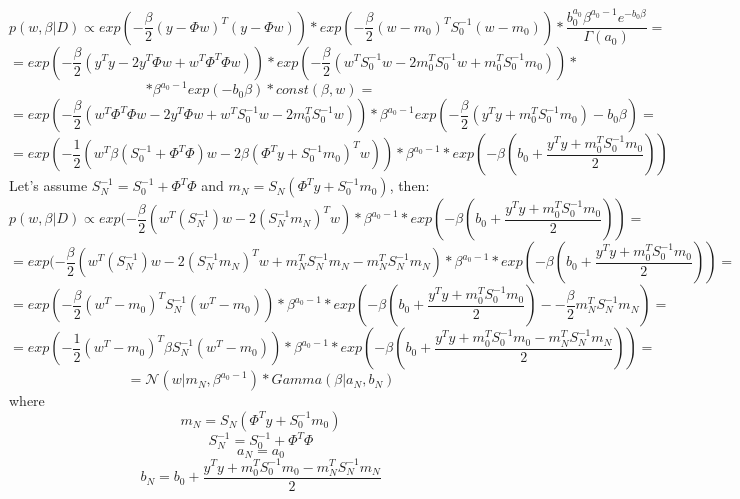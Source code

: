 \documentclass[11pt]{article}
\newcommand{\exercise}{\section{}}
\begin{document}
\exercise
$$p(w,\beta|D) \propto exp(-\frac{\beta}{2}(y-\Phi w)^T(y-\Phi w)) * exp(-\frac{\beta}{2}(w-m_0)^TS_0^{-1}(w-m_0))*\frac{b_0^{a_0}\beta^{a_0-1}e^{-b_0\beta}}{\Gamma(a_0)}=$$
$$= exp(-\frac{\beta}{2}(y^Ty-2y^T\Phi w+w^T\Phi^T\Phi w))*exp(-\frac{\beta}{2}(w^TS_0^{-1}w-2m_0^TS_0^{-1}w+m_0^TS_0^{-1}m_0))*$$
$$*\beta^{a_0-1}exp(-b_0\beta)*const(\beta,w)=$$
$$=exp(-\frac{\beta}{2}(w^T\Phi^T\Phi w-2y^T\Phi w+w^TS_0^{-1}w-2m_0^TS_0^{-1}w))*\beta^{a_0-1}exp(-\frac{\beta}{2}(y^Ty+m_0^TS_0^{-1}m_0)-b_0\beta)=$$
$$=exp(-\frac{1}{2}(w^T\beta(S_0^{-1}+\Phi^T\Phi)w-2\beta(\Phi^Ty+S_0^{-1}m_0)^Tw))*\beta^{a_0-1}*exp(-\beta(b_0+\frac{y^Ty+m_0^TS_0^{-1}m_0}{2}))$$
Let's assume $S_N^{-1}= S_0^{-1}+\Phi^T\Phi$ and $m_N= S_N(\Phi^Ty+S_0^{-1}m_0)$, then:
$$p(w,\beta|D) \propto exp(-\frac{\beta}{2}(w^T(S_N^{-1})w-2(S_N^{-1}m_N)^Tw)*\beta^{a_0-1}*exp(-\beta(b_0+\frac{y^Ty+m_0^TS_0^{-1}m_0}{2}))=$$
$$=exp(-\frac{\beta}{2}(w^T(S_N^{-1})w-2(S_N^{-1}m_N)^Tw+m_N^TS_N^{-1}m_N-m_N^TS_N^{-1}m_N)*\beta^{a_0-1}*exp(-\beta(b_0+\frac{y^Ty+m_0^TS_0^{-1}m_0}{2}))= $$
$$=exp(-\frac{\beta}{2}(w^T-m_0)^TS_N^{-1}(w^T-m_0))*\beta^{a_0-1}*exp(-\beta(b_0+\frac{y^Ty+m_0^TS_0^{-1}m_0}{2})--\frac{\beta}{2}m_N^TS_N^{-1}m_N)=$$
$$=exp(-\frac{1}{2}(w^T-m_0)^T\beta S_N^{-1}(w^T-m_0))*\beta^{a_0-1}*exp(-\beta(b_0+\frac{y^Ty+m_0^TS_0^{-1}m_0-m_N^TS_N^{-1}m_N}{2}))=$$
$$=\mathcal{N}(w|m_N,\beta^{a_0-1})*Gamma(\beta|a_N, b_N)  $$
 where
$$m_N= S_N(\Phi^Ty+S_0^{-1}m_0)$$ 
$$S_N^{-1}= S_0^{-1}+\Phi^T\Phi$$
$$a_N=a_0$$
$$b_N=b_0+\frac{y^Ty+m_0^TS_0^{-1}m_0-m_N^TS_N^{-1}m_N}{2}$$
\end{document}
